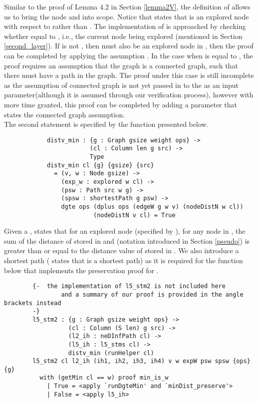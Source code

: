 Similar to the proof of Lemma 4.2 in Section \ref{lemma2V}, the definition of  allows us to bring the node  and  into scope. Notice that  states that  is an explored node with respect to  rather than . The implementation of  is approached by checking whether  equal to , i.e., the current node being explored (mentioned in Section \ref{second_layer}). If  is not , then  must also be an explored node in , then the proof can be completed by applying the assumption . In the case when  is equal to , the proof requires an assumption that the graph is a connected graph, such that there must have a  path in the graph. The proof under this case is still incomplete as the assumption of connected graph is not yet passed in to the  as an input parameter(although it is assumed through our verification process), however with more time granted, this proof can be completed by adding a parameter that states the connected graph assumption. 
\\

The second statement is specified by the  function presented below. 
\begin{lstlisting}
			distv_min : {g : Graph gsize weight ops} ->
			            (cl : Column len g src) ->
			            Type
			distv_min cl {g} {gsize} {src}
			  = (v, w : Node gsize) ->
			    (exp_w : explored w cl) ->
			    (psw : Path src w g) ->
			    (spsw : shortestPath g psw) ->
			    dgte ops (dplus ops (edgeW g w v) (nodeDistN w cl))
			    		 (nodeDistN v cl) = True

\end{lstlisting} 

Given a  ,  states that for an explored node  (specified by ), for any node  in , the sum of the distance of  stored in  and  (notation introduced in Section \ref{pseudo}) is greater than or equal to the distance value of  stored in . We also introduce a shortest  path  ( states that  is a shortest path) as it is required for the  function below that implements the preservation proof for . 
\begin{lstlisting}
		{-  the implementation of l5_stm2 is not included here 
				and a summary of our proof is provided in the angle brackets instead
		-}
		l5_stm2 : {g : Graph gsize weight ops} ->
		          (cl : Column (S len) g src) ->
		          (l2_ih : neDInfPath cl) ->
		          (l5_ih : l5_stms cl) ->
		          distv_min (runHelper cl)
		l5_stm2 cl l2_ih (ih1, ih2, ih3, ih4) v w expW psw spsw {ops} {g}
		  with (getMin cl == w) proof min_is_w
		    | True = <apply `runDgteMin' and `minDist_preserve'>
		    | False = <apply l5_ih>
\end{lstlisting}

